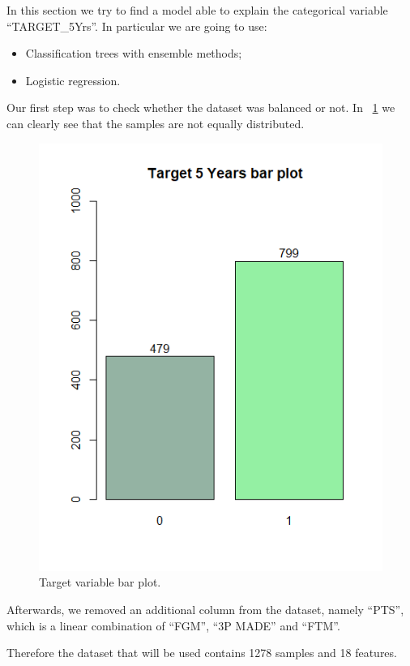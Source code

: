 In this section we try to find a model able to explain the categorical variable ``TARGET\_5Yrs''.
In particular we are going to use:
\begin{itemize}
	\item Classification trees with ensemble methods;
	\item Logistic regression.
\end{itemize}

Our first step was to check whether the dataset was balanced or not. In \Fig~\ref{fig:target_bar_plot} we can clearly see that the samples are not equally distributed. 

\begin{figure}[h]
	\centering
	\includegraphics[width=0.5\linewidth]{ImageFiles/Histograms/target_bar_plot}
	\caption{Target variable bar plot.}
	\label{fig:target_bar_plot}
\end{figure}

Afterwards, we removed an additional column from the dataset, namely ``PTS'', which is a linear combination of ``FGM'', ``3P MADE'' and ``FTM''.

Therefore the dataset that will be used contains 1278 samples and 18 features.
